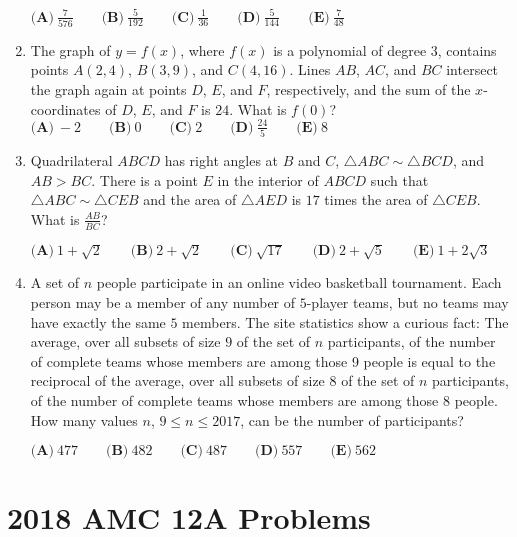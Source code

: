 \documentclass{article}
\begin{document}
\begin{enumerate}[label=\arabic*., itemsep=0.5em]
\(\textbf{(A)}\ \frac{7}{576} \qquad \textbf{(B)}\ \frac{5}{192} \qquad \textbf{(C)}\ \frac{1}{36} \qquad \textbf{(D)}\ \frac{5}{144} \qquad\textbf{(E)}\ \frac{7}{48}\)\par \vspace{0.5em}\item The graph of \(y=f(x)\), where \(f(x)\) is a polynomial of degree \(3\), contains points \(A(2,4)\), \(B(3,9)\), and \(C(4,16)\). Lines \(AB\), \(AC\), and \(BC\) intersect the graph again at points \(D\), \(E\), and \(F\), respectively, and the sum of the \(x\)-coordinates of \(D\), \(E\), and \(F\) is \(24\). What is \(f(0)\)?
\(\textbf{(A)}\ -2 \qquad \textbf{(B)}\ 0 \qquad \textbf{(C)}\ 2 \qquad \textbf{(D)}\ \frac{24}{5} \qquad\textbf{(E)}\ 8\)\par \vspace{0.5em}\item Quadrilateral \(ABCD\) has right angles at \(B\) and \(C\), \(\triangle ABC \sim \triangle BCD\), and \(AB > BC\). There is a point \(E\) in the interior of \(ABCD\) such that \(\triangle ABC \sim \triangle CEB\) and the area of \(\triangle AED\) is \(17\) times the area of \(\triangle CEB\). What is \(\frac{AB}{BC}\)?

\(\textbf{(A)}\ 1 + \sqrt{2} \qquad \textbf{(B)}\ 2 + \sqrt{2} \qquad \textbf{(C)}\ \sqrt{17} \qquad \textbf{(D)}\ 2 + \sqrt{5} \qquad\textbf{(E)}\ 1 + 2\sqrt{3}\)\par \vspace{0.5em}\item A set of \(n\) people participate in an online video basketball tournament. Each person may be a member of any number of \(5\)-player teams, but no teams may have exactly the same \(5\) members. The site statistics show a curious fact: The average, over all subsets of size \(9\) of the set of \(n\) participants, of the number of complete teams whose members are among those 9 people is equal to the reciprocal of the average, over all subsets of size \(8\) of the set of \(n\) participants, of the number of complete teams whose members are among those \(8\) people. How many values \(n\), \(9 \leq n \leq 2017\), can be the number of participants?

\(\textbf{(A)}\ 477 \qquad \textbf{(B)}\ 482 \qquad \textbf{(C)}\ 487 \qquad \textbf{(D)}\ 557 \qquad\textbf{(E)}\ 562\)\par \vspace{0.5em}
\end{enumerate}
\newpage\section*{2018 AMC 12A Problems}
\end{document}
